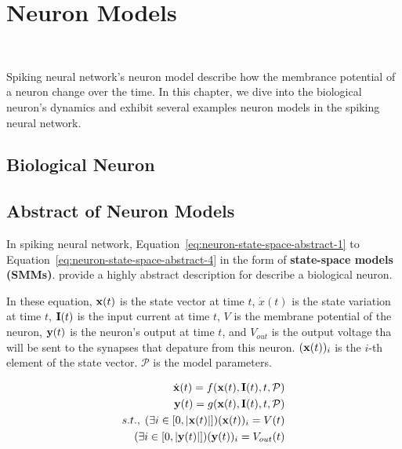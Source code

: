 

\chapter{Neuron Models}\

Spiking neural network's neuron model describe how the membrance potential of a neuron change over the time.
In this chapter, we dive into the biological neuron's dynamics and exhibit several examples neuron models in the 
spiking neural network. 


\section{Biological Neuron}


\section{Abstract of Neuron Models}
In spiking neural network, Equation~\ref{eq:neuron-state-space-abstract-1} to
Equation~\ref{eq:neuron-state-space-abstract-4} in the form of \textbf{state-space models (SMMs)}.
provide a highly abstract description for describe a biological neuron.

In these equation, $\bold x(t)$ is the state vector at time $t$, $\dot x(t)$ is the state variation at time 
$t$, $\bold I(t)$ is the input current at time $t$, $V$ is the membrane potential of the neuron, 
$\bold y(t)$ is the neuron's output at time $t$, and $V_{out}$ is the output voltage tha will be sent to the 
synapses that depature from this neuron. 
$(\bold x(t))_{i}$ is the $i$-th element of the state vector. $\mathcal P$ is the model parameters.

\begin{align}
    \dot {\bold x}(t) = f(\bold x(t), \bold I(t), t, \mathcal P) \label{eq:neuron-state-space-abstract-1}  \\
    \bold y(t) = g(\bold x(t), \bold I(t), t, \mathcal P) \label{eq:neuron-state-space-abstract-2} \\
    s.t.,\; (\exists i \in [0, |\bold x(t)|])(\bold x({t}))_{i} = V(t) \label{eq:neuron-state-space-abstract-3} \\
            (\exists i \in [0, |\bold y(t)|])(\bold y(t))_i = V_{out}(t) \label{eq:neuron-state-space-abstract-4}
\end{align}


